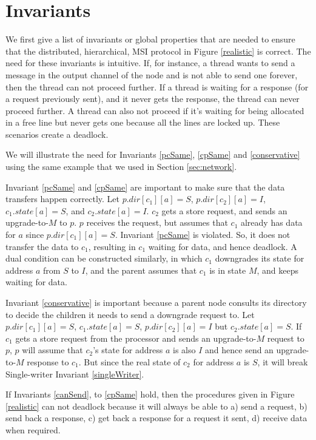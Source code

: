 \section{Invariants}
\label{sec:properties}

We first give a list of invariants or global properties that are needed to
ensure that the distributed, hierarchical, MSI protocol in Figure
\ref{realistic} is correct.
The need for these invariants is intuitive. If, for instance, a thread wants to
send a message in the output channel of the node and is not able to send one
forever, then the thread can not proceed further. If a thread is waiting for a
response (for a request previously sent), and it never gets the response, the
thread can never proceed further. A thread can also not proceed if it's waiting
for being allocated in a free line but never gets one because all the lines are
locked up. These scenarios create a deadlock.

We will illustrate the need for Invariants \ref{pcSame}, \ref{cpSame} and
\ref{conservative} using the same example that we used in Section
\ref{sec:network}.

Invariant \ref{pcSame} and \ref{cpSame} are important to make sure that the data
transfers happen correctly. Let $p.dir[c_1][a] = S$, $p.dir[c_2][a] = I$,
$c_1.state[a] = S$, and $c_2.state[a] = I$. $c_2$ gets a store request, and
sends an upgrade-to-$M$ to $p$. $p$ receives the request, but assumes that
$c_1$ already has data for $a$ since $p.dir[c_1][a] = S$. Invariant \ref{pcSame}
is violated. So, it does not transfer the data to $c_1$, resulting in $c_1$
waiting for data, and hence deadlock. A dual condition can be constructed
similarly, in which $c_1$ downgrades its state for address $a$ from $S$ to $I$,
and the parent assumes that $c_1$ is in state $M$, and keeps waiting for data.

Invariant \ref{conservative} is important because a parent node consults its
directory to decide the children it needs to send a downgrade request to.  Let
$p.dir[c_1][a] = S$, $c_1.state[a] = S$, $p.dir[c_2][a] = I$ but
$c_2.state[a] = S$. If $c_1$ gets a store request from the processor and sends
an upgrade-to-$M$ request to $p$, $p$ will assume that $c_2$'s state for address $a$
is also $I$ and hence send an upgrade-to-$M$ response to $c_1$. But since the real
state of  $c_2$ for address $a$ is $S$, it will break Single-writer Invariant
\ref{singleWriter}.

If Invariants \ref{canSend}, to \ref{cpSame} hold, then the procedures given
in Figure \ref{realistic} can not deadlock because it will always be able to a)
send a request, b) send back a response, c) get back a response for a request
it sent, d) receive data when required.

